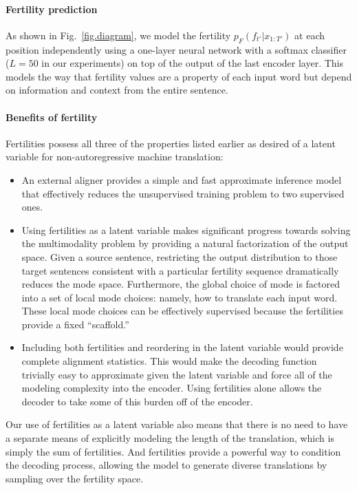 \documentclass{article} %
\begin{document}
\vspace{-5pt}
\paragraph{Fertility prediction} As shown in Fig.~\ref{fig.diagram}, we model the fertility $p_F(f_{t'}|x_{1:T'})$ at each position independently using a one-layer neural network with a softmax classifier ($L=50$ in our experiments) on top of the output of the last encoder layer. This models the way that fertility values are a property of each input word but depend on information and context from the entire sentence.

\vspace{-5pt}
\paragraph{Benefits of fertility} 
Fertilities possess all three of the properties listed earlier as desired of a latent variable for non-autoregressive machine translation:
\begin{itemize}[leftmargin=*]
\item An external aligner provides a simple and fast approximate inference model that effectively reduces the unsupervised training problem to two supervised ones.
\item Using fertilities as a latent variable makes significant progress towards solving the multimodality problem by providing a natural factorization of the output space.
Given a source sentence, restricting the output distribution to those target sentences consistent with a particular fertility sequence dramatically reduces the mode space. Furthermore, the global choice of mode is factored into a set of local mode choices: namely, how to translate each input word. These local mode choices can be effectively supervised because the fertilities provide a fixed ``scaffold.''
\item Including both fertilities and reordering in the latent variable would provide complete alignment statistics. This would make the decoding function trivially easy to approximate given the latent variable and force all of the modeling complexity into the encoder. Using fertilities alone allows the decoder to take some of this burden off of the encoder.
\end{itemize}
Our use of fertilities as a latent variable also means that there is no need to have a separate means of explicitly modeling the length of the translation, which is simply the sum of fertilities.
And fertilities provide a powerful way to condition the decoding process, allowing the model to generate diverse translations by sampling over the fertility space.
\end{document}
